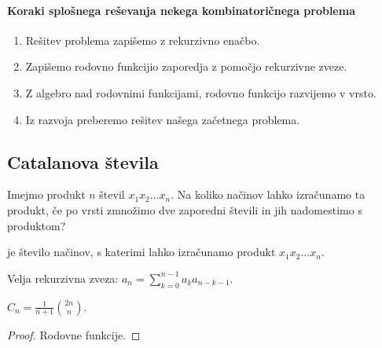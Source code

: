 \paragraph{Koraki splošnega reševanja nekega kombinatoričnega problema}
\begin{enumerate}
    \item Rešitev problema zapišemo z rekurzivno enačbo.
    \item Zapišemo rodovno funkcijio zaporedja z pomočjo rekurzivne zveze.
    \item Z algebro nad rodovnimi funkcijami, rodovno funkcijo razvijemo v vrsto.
    \item Iz razvoja preberemo rešitev našega začetnega problema.
\end{enumerate}

\subsection{Catalanova števila}
Imejmo produkt $n$ števil $x_1x_2 \ldots x_n$. Na koliko načinov lahko izračunamo ta produkt, če po vrsti zmnožimo dve zaporedni števili in jih nadomestimo s produktom?

\begin{definicija}
     je število načinov, s katerimi lahko izračunamo produkt $x_1x_2 \ldots x_n$.
\end{definicija}

\begin{opomba}
    Velja rekurzivna zveza: $a_n = \sum_{k=0}^{n-1}a_ka_{n-k-1}$.
\end{opomba}

\begin{trditev}
    $C_n = \frac{1}{n+1} \binom{2n}{n}$.
\end{trditev}

\begin{proof}
    Rodovne funkcije.
\end{proof}
